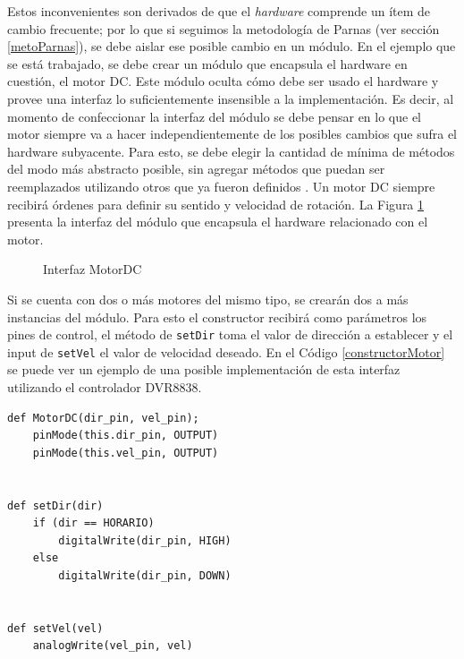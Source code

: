 Estos inconvenientes son derivados de que el \textit{hardware} comprende un ítem de cambio frecuente; por lo que si seguimos la metodología de Parnas (ver sección \ref{metoParnas}), se debe aislar ese posible cambio en un módulo. En el ejemplo que se está trabajado, se debe crear un módulo que encapsula el hardware en cuestión, el motor \gls{DC}. Este módulo oculta cómo debe ser usado el hardware y provee una interfaz lo suficientemente insensible a la implementación. Es decir, al momento de confeccionar la interfaz del módulo se debe pensar en lo que el motor siempre va a hacer independientemente de los posibles cambios que sufra el hardware subyacente. Para esto, se debe elegir la cantidad de mínima de métodos del modo más abstracto posible, sin agregar métodos que puedan ser reemplazados utilizando otros que ya fueron definidos \cite{Parnas02, parnas1977abstract}.
Un motor \gls{DC} siempre recibirá órdenes para definir su sentido y velocidad de rotación. La Figura \ref{interfazMotor} presenta la interfaz del módulo \MotorDC que encapsula el hardware relacionado con el motor.

\begin{figure}[H]
\caption{Interfaz MotorDC}
\label{interfazMotor}
\begin{center}
\end{center}
\end{figure}

Si se cuenta con dos o más motores del mismo tipo, se crearán dos a más instancias del módulo. Para esto el constructor recibirá como parámetros los pines de control, el método de \verb|setDir| toma el valor de dirección a establecer y el input de \verb|setVel| el valor de velocidad deseado. En el Código \ref{constructorMotor} se puede ver un ejemplo de una posible implementación de esta interfaz utilizando el controlador \gls{DVR8838}.

\begin{lstlisting}[caption=Posible implementación de la interfaz del módulo MotorDC.,label={constructorMotor}]
def MotorDC(dir_pin, vel_pin);
    pinMode(this.dir_pin, OUTPUT)
    pinMode(this.vel_pin, OUTPUT)


def setDir(dir) 
    if (dir == HORARIO)
        digitalWrite(dir_pin, HIGH)
    else
        digitalWrite(dir_pin, DOWN)
        

def setVel(vel)
    analogWrite(vel_pin, vel)

\end{lstlisting}

